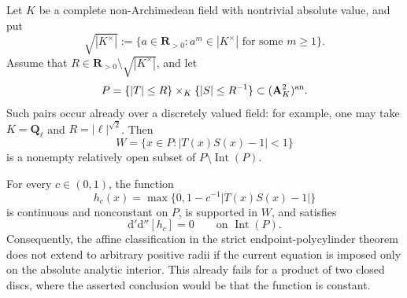 
\begin{proposition}\label{prop:p062-nonstrict-boundary-resonance-counterexample}
Let \(K\) be a complete non-Archimedean field with nontrivial absolute
value, and put
\[
 \sqrt{|K^\times|}
 :=\{a\in\mathbf R_{>0}:a^m\in|K^\times|
                         \text{ for some }m\geq1\}.
\]
Assume that \(R\in\mathbf R_{>0}\setminus\sqrt{|K^\times|}\), and let
\begin{equation}\label{eq:p062-resonant-bidisc-domain}
 P=\{|T|\leq R\}\times_K\{|S|\leq R^{-1}\}
       \subset(\mathbf A^2_K)^{\mathrm{an}}.
\end{equation}
Such pairs occur already over a discretely valued field: for example, one
may take \(K=\mathbf Q_\ell\) and \(R=|\ell|^{\sqrt 2}\).
Then
\begin{equation}\label{eq:p062-resonant-boundary-tube}
             W=\{x\in P:|T(x)S(x)-1|<1\}
\end{equation}
is a nonempty relatively open subset of
\(P\setminus\operatorname{Int}(P)\).

For every \(c\in(0,1)\), the function
\begin{equation}\label{eq:p062-resonant-cutoff}
 h_c(x)=\max\bigl\{0,1-c^{-1}|T(x)S(x)-1|\bigr\}
\end{equation}
is continuous and nonconstant on \(P\), is supported in \(W\), and
satisfies
\begin{equation}\label{eq:p062-resonant-zero-current}
                \mathrm d'\mathrm d''[h_c]=0
                \qquad\text{on }\operatorname{Int}(P).
\end{equation}
Consequently, the affine classification in the strict endpoint-polycylinder
theorem does not extend to arbitrary positive radii if the current equation
is imposed only on the absolute analytic interior.  This already fails for
a product of two closed discs, where the asserted conclusion would be that
the function is constant.
\end{proposition}


